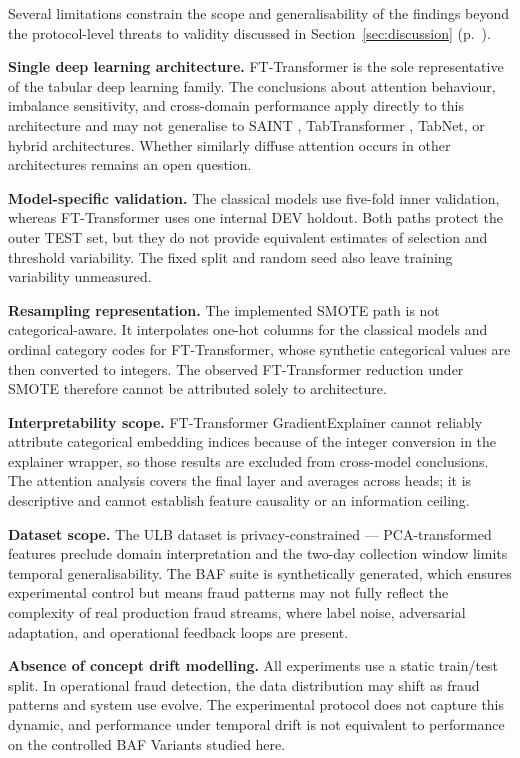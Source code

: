 Several limitations constrain the scope and generalisability of the findings beyond the protocol-level threats to validity discussed in Section~\ref{sec:discussion} (p.~\pageref{sec:discussion}).

\textbf{Single deep learning architecture.} FT-Transformer is the sole representative of the tabular deep learning family. The conclusions about attention behaviour, imbalance sensitivity, and cross-domain performance apply directly to this architecture and may not generalise to SAINT \cite{somepalli2021saint}, TabTransformer \cite{huang2020tabtransformer}, TabNet, or hybrid architectures. Whether similarly diffuse attention occurs in other architectures remains an open question.

\textbf{Model-specific validation.} The classical models use five-fold inner validation, whereas FT-Transformer uses one internal DEV holdout. Both paths protect the outer TEST set, but they do not provide equivalent estimates of selection and threshold variability. The fixed split and random seed also leave training variability unmeasured.

\textbf{Resampling representation.} The implemented SMOTE path is not categorical-aware. It interpolates one-hot columns for the classical models and ordinal category codes for FT-Transformer, whose synthetic categorical values are then converted to integers. The observed FT-Transformer reduction under SMOTE therefore cannot be attributed solely to architecture.

\textbf{Interpretability scope.} FT-Transformer GradientExplainer cannot reliably attribute categorical embedding indices because of the integer conversion in the explainer wrapper, so those results are excluded from cross-model conclusions. The attention analysis covers the final layer and averages across heads; it is descriptive and cannot establish feature causality or an information ceiling.

\textbf{Dataset scope.} The ULB dataset is privacy-constrained — PCA-transformed features preclude domain interpretation and the two-day collection window limits temporal generalisability. The BAF suite is synthetically generated, which ensures experimental control but means fraud patterns may not fully reflect the complexity of real production fraud streams, where label noise, adversarial adaptation, and operational feedback loops are present.

\textbf{Absence of concept drift modelling.} All experiments use a static train/test split. In operational fraud detection, the data distribution may shift as fraud patterns and system use evolve. The experimental protocol does not capture this dynamic, and performance under temporal drift is not equivalent to performance on the controlled BAF Variants studied here.

